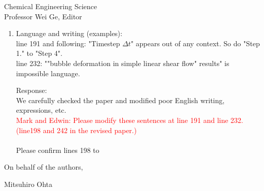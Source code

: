 \documentclass{letter}
\begin{document}
\begin{letter}{
Chemical Engineering Science\\
Professor Wei Ge, Editor\\}
\begin{enumerate}
\par\noindent
\item
\textsf
{Language and writing (examples):\\
line 191 and following: "Timestep $\Delta t$" appears out of any context. So do "Step 1." to "Step 4".\\
line 232: ""bubble deformation in simple linear shear flow" results" is impossible language. \\}
\vspace{3 mm}

Response: \\
We carefully checked the paper and modified poor English writing, expressions, etc.\\
\textcolor{red}
{
Mark and Edwin: Please modify these sentences at line 191 and line 232. (line198 and 242 in the revised paper.)\\
}
\\
Please confirm lines  198 to 
\\


\end{enumerate}

\closing{On behalf of the authors,}
Mitsuhiro Ohta

\end{letter}
\end{document}

